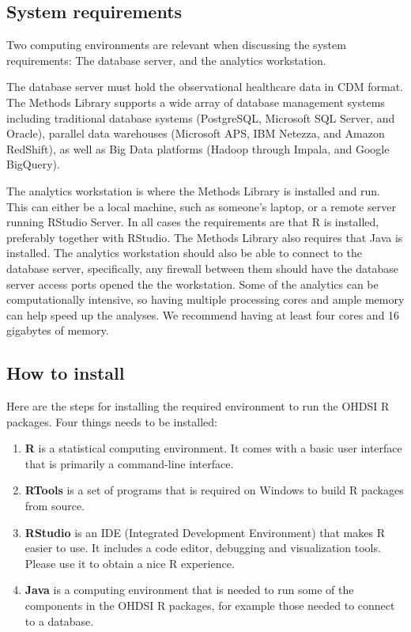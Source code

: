\documentclass[11pt]{book}
\providecommand{\tightlist}{%
  \setlength{\itemsep}{0pt}\setlength{\parskip}{0pt}}
\theoremstyle{definition}
\theoremstyle{definition}
\theoremstyle{definition}
\theoremstyle{remark}
\begin{document}
\hypertarget{system-requirements}{%
\subsection{System requirements}\label{system-requirements}}

Two computing environments are relevant when discussing the system requirements: The database server, and the analytics workstation. 

The database server must hold the observational healthcare data in CDM format. The Methods Library supports a wide array of database management systems including traditional database systems (PostgreSQL, Microsoft SQL Server, and Oracle), parallel data warehouses (Microsoft APS, IBM Netezza, and Amazon RedShift), as well as Big Data platforms (Hadoop through Impala, and Google BigQuery).

The analytics workstation is where the Methods Library is installed and run. This can either be a local machine, such as someone's laptop, or a remote server running RStudio Server. In all cases the requirements are that R is installed, preferably together with RStudio. The Methods Library also requires that Java is installed. The analytics workstation should also be able to connect to the database server, specifically, any firewall between them should have the database server access ports opened the the workstation. Some of the analytics can be computationally intensive, so having multiple processing cores and ample memory can help speed up the analyses. We recommend having at least four cores and 16 gigabytes of memory.

\hypertarget{installR}{%
\subsection{How to install}\label{installR}}

Here are the steps for installing the required environment to run the OHDSI R packages. Four things needs to be installed: 

\begin{enumerate}
\def\labelenumi{\arabic{enumi}.}
\tightlist
\item
  \textbf{R} is a statistical computing environment. It comes with a basic user interface that is primarily a command-line interface.
\item
  \textbf{RTools} is a set of programs that is required on Windows to build R packages from source.
\item
  \textbf{RStudio} is an IDE (Integrated Development Environment) that makes R easier to use. It includes a code editor, debugging and visualization tools. Please use it to obtain a nice R experience.
\item
  \textbf{Java} is a computing environment that is needed to run some of the components in the OHDSI R packages, for example those needed to connect to a database.
\end{enumerate}
\end{document}
